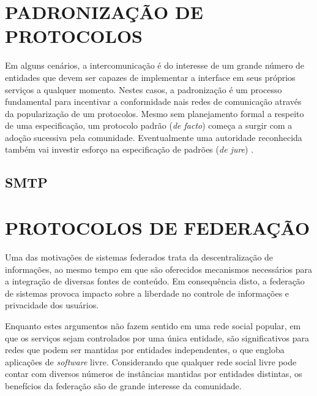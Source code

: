 \section{PADRONIZAÇÃO DE PROTOCOLOS}

Em alguns cenários, a intercomunicação é do interesse de um grande número de
entidades que devem ser capazes de implementar a interface em seus próprios serviços
a qualquer momento. Nestes casos, a padronização é um processo fundamental para
incentivar a conformidade nais redes de comunicação através da popularização de um
protocolos. Mesmo sem planejamento formal a respeito de uma especificação, um
protocolo padrão (\textit{de facto}) começa a surgir com a adoção sucessiva pela
comunidade. Eventualmente uma autoridade reconhecida também vai investir esforço na
especificação de padrões (\textit{de jure}) \cite{tanenbaum2010}.



\subsection{SMTP}



\section{PROTOCOLOS DE FEDERAÇÃO}


Uma das motivações de sistemas federados trata da descentralização de informações, ao
mesmo tempo em que são oferecidos mecanismos necessários para a integração de
diversas fontes de conteúdo. Em consequência disto, a federação de sistemas provoca
impacto sobre a liberdade no controle de informações e privacidade dos usuários.

Enquanto estes argumentos não fazem sentido em uma rede social popular, em que os
serviços sejam controlados por uma única entidade, são significativos para redes que
podem ser mantidas por entidades independentes, o que engloba aplicações de
\textit{software} livre. Considerando que qualquer rede social livre pode contar com
diversos números de instâncias mantidas por entidades distintas, os benefícios da
federação são de grande interesse da comunidade.

